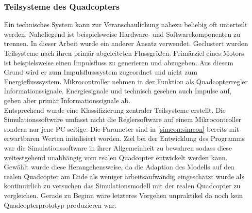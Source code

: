 \subsubsection{Teilsysteme des Quadcopters}
Ein technisches System kann zur Veranschaulichung nahezu beliebig oft unterteilt werden. Naheliegend ist beispielsweise Hardware- und Softwarekomponenten zu trennen. In dieser Arbeit wurde ein anderer Ansatz verwendet. Geclustert wurden Teilsysteme nach ihren primär abgeleiteten Flussgrößen. Primärziel eines Motors ist beispielsweise einen Impulsfluss zu generieren und abzugeben. Aus diesem Grund wird er zum Impulsflusssystem zugeordnet und nicht zum Energieflusssystem. Mikrocontroller nehmen in der Funktion als Quadcopterregler Informationssignale, Energiesignale und technisch gesehen auch Impulse auf, geben aber primär Informationssignale ab.\\
Entsprechend wurde eine Klassifizierung zentraler Teilsysteme erstellt. Die Simulationssoftware umfasst nicht die Reglersoftware auf einem Mikrocontroller sondern nur jene PC seitige. Die Parameter sind in \ref{simcon:simcon} bereits mit erwartbaren Werten initalisiert worden. Ziel bei der Entwicklung des Programms war die Simulationssoftware in ihrer Allgemeinheit zu bewahren sodass diese weitestgehend unabhängig vom realen Quadcopter entwickelt werden kann. Gewählt wurde diese Herangehensweise, da die Adaption des Modells auf den realen Quadcopter am Ende als weniger arbeitsaufwändig eingeschätzt wurde als kontinuirlich zu versuchen das Simulationsmodell mit der realen Quadcopter zu vergleichen. Gerade zu Beginn wäre letzteres Vorgehen unpraktikel da noch kein Quadcopterprototyp produzieren war.
\vspace*{0.5cm}
